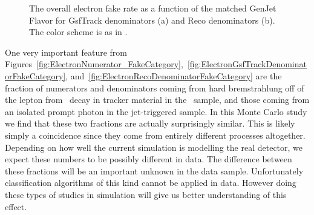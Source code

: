 \documentclass{cmspaper}
\begin{document}
\begin{figure}[htb]
\begin{center}
   \caption{The overall electron fake rate as a function of the matched GenJet Flavor for GsfTrack denominators (a) and Reco denominators (b). The color scheme is as in .}
   \label{fig:ElectronFakeRate_JetFlavor}
\end{center}
\end{figure}


One very important feature from Figures~\ref{fig:ElectronNumerator_FakeCategory},~\ref{fig:ElectronGsfTrackDenominatorFakeCategory}, and~\ref{fig:ElectronRecoDenominatorFakeCategory} are the fraction of numerators and denominators coming from hard bremstrahlung off of the lepton from \WPM\ decay in tracker material in the \WPlusJets\ sample, and those coming from an isolated prompt photon in the jet-triggered sample. In this Monte Carlo study we find that these two fractions are actually surprisingly similar. This is likely simply a coincidence since they come from entirely different processes altogether. Depending on how well the current simulation is modelling the real detector, we expect these numbers to be possibly different in data. The difference between these fractions will be an important unknown in the data sample. Unfortunately classification algorithms of this kind cannot be applied in data. However doing these types of studies in simulation will give us better understanding of this effect. 
\end{document}
